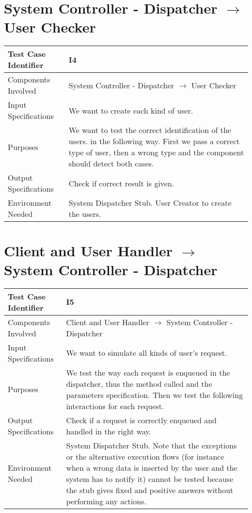 \documentclass[\mainpath/main]{subfiles}
\begin{document}
\section{System Controller - Dispatcher $\rightarrow$ User Checker}

\begin{tabular}[!ht]{l@{\hspace{1cm}}p{8.5cm}}
	\hline  Test Case Identifier & I4\\ 
	\hline  Components Involved & System Controller - Dispatcher $\rightarrow$ User Checker\\ 
	\hline  Input Specifications & We want to create each kind of user.\\ 
	\hline  Purposes & We want to test the correct identification of the users. in the following way. First we pass a correct type of user, then a wrong type and the component should detect both cases.\\ 
	\hline  Output Specifications & Check if correct result is given.\\ 
	\hline  Environment Needed & System Dispatcher Stub. User Creator to create the users.\\ 
	\hline 
\end{tabular} 

\section{Client and User Handler $\rightarrow$ System Controller - Dispatcher}

\begin{tabular}[!ht]{l@{\hspace{1cm}}p{8.5cm}}
	\hline  Test Case Identifier & I5\\ 
	\hline  Components Involved & Client and User Handler $\rightarrow$ System Controller - Dispatcher\\ 
	\hline  Input Specifications & We want to simulate all kinds of user's request.\\ 
	\hline  Purposes & We test the way each request is enqueued in the dispatcher, thus the method called and the parameters specification. Then we test the following interactions for each request.\\
	\hline  Output Specifications & Check if a request is correctly enqueued and handled in the right way.\\ 
	\hline  Environment Needed & System Dispatcher Stub. Note that the exceptions or the alternative execution flows (for instance when a wrong data is inserted by the user and the system has to notify it) cannot be tested because the stub gives fixed and positive answers without performing any actions.\\ 
	\hline 
\end{tabular} 
\end{document}
